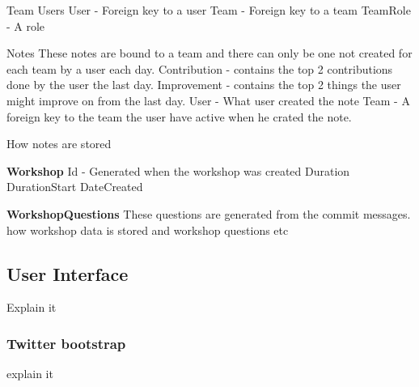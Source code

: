 Team Users
User - Foreign key to a user
Team - Foreign key to a team
TeamRole - A role 

Notes
These notes are bound to a team and there can only be one not created for each team by a user each day.
Contribution - contains the top 2 contributions done by the user the last day.
Improvement - contains the top 2 things the user might improve on from the last day.
User - What user created the note
Team - A foreign key to the team the user have active when he crated the note.

How notes are stored

\textbf{Workshop} 
Id - Generated when the workshop was created
Duration
DurationStart
DateCreated


\textbf{WorkshopQuestions}
These questions are generated from the commit messages.
how workshop data is stored and workshop questions etc

\subsection{User Interface}
Explain it

\subsubsection{Twitter bootstrap}
explain it
